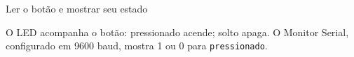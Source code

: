 \begin{frame}[fragile,t]{Ler o botão e mostrar seu estado}

\small O LED acompanha o botão: pressionado acende; solto apaga. O Monitor Serial, configurado em 9600 baud, mostra 1 ou 0 para \texttt{pressionado}.
\end{frame}
